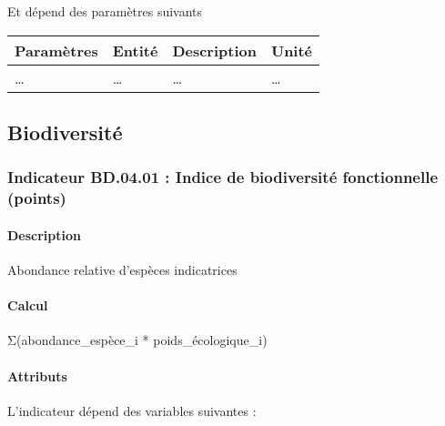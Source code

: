 \documentclass[
]{article}
\newenvironment{Shaded}{\begin{snugshade}}{\end{snugshade}}
\newcommand{\NormalTok}[1]{#1}
\begin{document}
Et dépend des paramètres suivants

\begin{longtable}[]{@{}llll@{}}
\toprule\noalign{}
\textbf{Paramètres} & \textbf{Entité} & \textbf{Description} &
\textbf{Unité} \\
\midrule\noalign{}
\endhead
\bottomrule\noalign{}
\endlastfoot
\ldots{} & \ldots{} & \ldots{} & \ldots{} \\
\end{longtable}

\subsection{Biodiversité}\label{biodiversituxe9}

\subsubsection{Indicateur BD.04.01 : Indice de biodiversité
fonctionnelle
(points)}\label{indicateur-bd.04.01-indice-de-biodiversituxe9-fonctionnelle-points}

\paragraph{Description}\label{description-23}

Abondance relative d'espèces indicatrices

\paragraph{Calcul}\label{calcul-23}

\begin{Shaded}
\begin{Highlighting}[]
\NormalTok{Σ(abondance\_espèce\_i * poids\_écologique\_i)}
\end{Highlighting}
\end{Shaded}

\paragraph{Attributs}\label{attributs-41}

L'indicateur dépend des variables suivantes :
\end{document}
